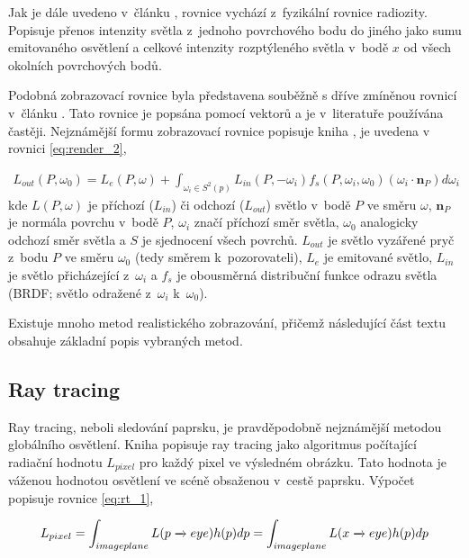 Jak je dále uvedeno v~článku \cite{render_eq}, rovnice vychází z~fyzikální rovnice radiozity. Popisuje přenos intenzity světla z~jednoho povrchového bodu do jiného jako sumu emitovaného osvětlení a celkové intenzity rozptýleného světla v~bodě $x$ od všech okolních povrchových bodů.

Podobná zobrazovací rovnice byla představena souběžně s dříve zmíněnou rovnicí v~článku \cite{render_eq_2}. Tato rovnice je popsána pomocí vektorů a je v~literatuře používána častěji. Nejznámější formu zobrazovací rovnice popisuje kniha \cite{gfx_principles_practice}, je uvedena v rovnici \ref{eq:render_2},

\begin{equation} \label{eq:render_2}
	\begin{gathered}
		L_{out}(P, \omega_0) = L_e(P, \omega) + \int_{\omega_i\in S^2(p)}L_{in}(P, -\omega_i)f_s(P, \omega_i, \omega_0)(\omega_i \cdot \textbf{n}_P)d\omega_i
	\end{gathered}
\end{equation}
kde $L(P, \omega)$ je příchozí ($L_{in}$) či odchozí ($L_{out}$) světlo v~bodě $P$ ve směru $\omega$, $\textbf{n}_P$ je normála povrchu v~bodě $P$, $\omega_i$ značí příchozí směr světla, $\omega_0$ analogicky odchozí směr světla a $S$ je sjednocení všech povrchů. $L_{out}$ je světlo vyzářené pryč z~bodu $P$ ve směru $\omega_0$ (tedy směrem k~pozorovateli), $L_e$ je emitované světlo, $L_{in}$ je světlo přicházející z~$\omega_i$ a $f_s$ je obousměrná distribuční funkce odrazu světla (BRDF; světlo odražené z~$\omega_i$ k~$\omega_0$).

Existuje mnoho metod realistického zobrazování, přičemž následující část textu obsahuje základní popis vybraných metod.

\subsection{Ray tracing}\label{sec:ray_tracing}
Ray tracing, neboli sledování paprsku, je pravděpodobně nejznámější metodou globálního osvětlení. Kniha \cite{advanced_global} popisuje ray tracing jako algoritmus počítající radiační hodnotu $L_{pixel}$ pro každý pixel ve výsledném obrázku. Tato hodnota je váženou hodnotou osvětlení ve scéně obsaženou v~cestě paprsku. Výpočet popisuje rovnice \ref{eq:rt_1},

\begin{equation} \label{eq:rt_1}
	L_{pixel} = \int_{imageplane}L(p \xrightarrow{} eye)h(p)dp \\= \int_{imageplane}L(x \xrightarrow{} eye)h(p)dp
\end{equation}

